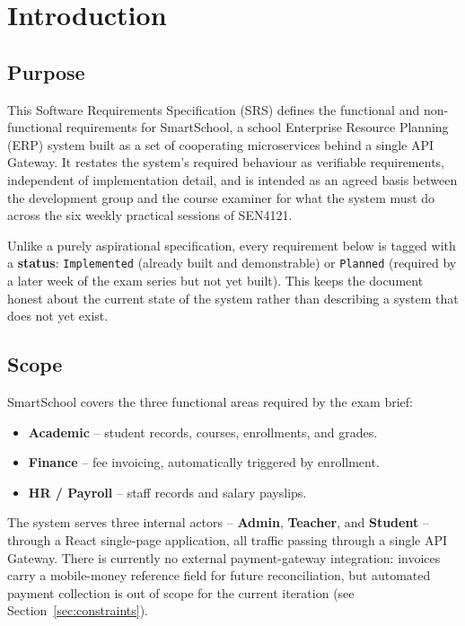 \documentclass[11pt,a4paper]{report}
\newcommand{\sysname}{SmartSchool}
\begin{document}
\tableofcontents
\clearpage

\chapter{Introduction}

\section{Purpose}
This Software Requirements Specification (SRS) defines the functional and
non-functional requirements for \sysname{}, a school Enterprise Resource
Planning (ERP) system built as a set of cooperating microservices behind a
single API Gateway. It restates the system's required behaviour as
verifiable requirements, independent of implementation detail, and is
intended as an agreed basis between the development group and the course
examiner for what the system must do across the six weekly practical
sessions of SEN4121.

Unlike a purely aspirational specification, every requirement below is
tagged with a \textbf{status}: \texttt{Implemented} (already built and
demonstrable) or \texttt{Planned} (required by a later week of the exam
series but not yet built). This keeps the document honest about the current
state of the system rather than describing a system that does not yet
exist.

\section{Scope}
\sysname{} covers the three functional areas required by the exam brief:
\begin{itemize}[itemsep=2pt]
    \item \textbf{Academic} -- student records, courses, enrollments, and grades.
    \item \textbf{Finance} -- fee invoicing, automatically triggered by enrollment.
    \item \textbf{HR / Payroll} -- staff records and salary payslips.
\end{itemize}
The system serves three internal actors -- \textbf{Admin}, \textbf{Teacher},
and \textbf{Student} -- through a React single-page application, all traffic
passing through a single API Gateway. There is currently no external
payment-gateway integration: invoices carry a mobile-money reference field
for future reconciliation, but automated payment collection is out of scope
for the current iteration (see Section~\ref{sec:constraints}).
\end{document}
